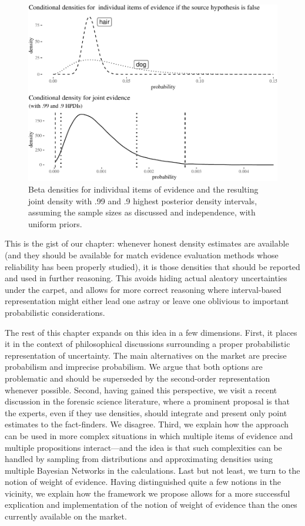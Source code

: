 \documentclass[
  10pt,
  dvipsnames,enabledeprecatedfontcommands]{scrartcl}
\begin{document}
\begin{figure}[H]

\begin{center}\includegraphics[width=0.8\linewidth]{chapter-outline_files/figure-latex/fig:densities-1} \end{center}
\caption{Beta densities for individual items of evidence and the resulting joint density with .99 and .9 highest posterior density intervals, assuming the sample sizes as discussed and independence, with uniform priors.}
\label{fig:densities}
\end{figure}


This is the gist of our chapter: whenever honest density estimates are
available (and they should be available for match evidence evaluation
methods whose reliability has been properly studied), it is those
densities that should be reported and used in further reasoning. This
avoids hiding actual aleatory uncertainties under the carpet, and allows
for more correct reasoning where interval-based representation might
either lead one astray or leave one oblivious to important probabilistic
considerations.

The rest of this chapter expands on this idea in a few dimensions.
First, it places it in the context of philosophical discussions
surrounding a proper probabilistic representation of uncertainty. The
main alternatives on the market are precise probabilism and imprecise
probabilism. We argue that both options are problematic and should be
superseded by the second-order representation whenever possible. Second,
having gained this perspective, we visit a recent discussion in the
forensic science literature, where a prominent proposal is that the
experts, even if they use densities, should integrate and present only
point estimates to the fact-finders. We disagree. Third, we explain how
the approach can be used in more complex situations in which multiple
items of evidence and multiple propositions interact---and the idea is
that such complexities can be handled by sampling from distributions and
approximating densities using multiple Bayesian Networks in the
calculations. Last but not least, we turn to the notion of weight of
evidence. Having distinguished quite a few notions in the vicinity, we
explain how the framework we propose allows for a more successful
explication and implementation of the notion of weight of evidence than
the ones currently available on the market.
\end{document}
